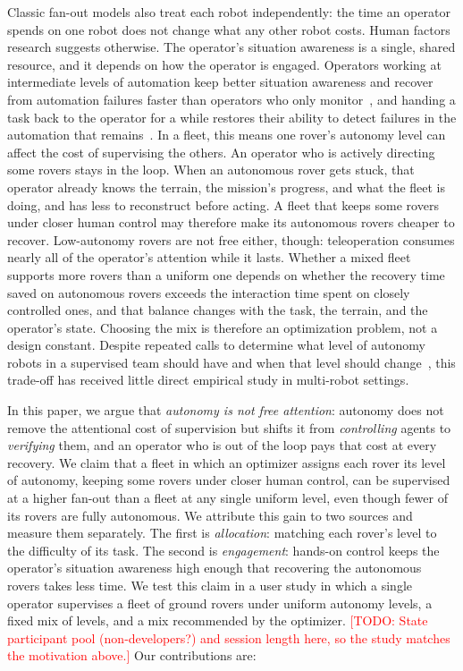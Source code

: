 \documentclass[conference]{IEEEtran}
\newcommand{\todo}[1]{\textcolor{red}{[TODO: #1]}}
\begin{document}
Classic fan-out models also treat each robot independently: the time
an operator spends on one robot does not change what any other robot
costs. Human factors research suggests otherwise. The operator's
situation awareness is a single, shared resource, and it depends on
how the operator is engaged. Operators working at intermediate levels
of automation keep better situation awareness and recover from
automation failures faster than operators who only
monitor~\cite{endsley1995outoftheloop,kaber2004effects}, and handing
a task back to the operator for a while restores their ability to
detect failures in the automation that remains~\cite{parasuraman1996effects}.
In a fleet, this means one rover's autonomy level can affect the
cost of supervising the others. An operator who is actively directing
some rovers stays in the loop. When an autonomous rover gets stuck,
that operator already knows the terrain, the mission's progress, and
what the fleet is doing, and has less to reconstruct before acting.
A fleet that keeps some rovers under closer human control may
therefore make its autonomous rovers cheaper to recover. Low-autonomy
rovers are not free either, though: teleoperation consumes nearly all
of the operator's attention while it lasts. Whether a mixed fleet
supports more rovers than a uniform one depends on whether the
recovery time saved on autonomous rovers exceeds the interaction time
spent on closely controlled ones, and that balance changes with the
task, the terrain, and the operator's state. Choosing the mix is
therefore an optimization problem, not a design constant. Despite
repeated calls to determine what level of autonomy robots in a
supervised team should have and when that level should
change~\cite{crandall2007identifying,chen2014human}, this trade-off
has received little direct empirical study in multi-robot settings.

In this paper, we argue that \emph{autonomy is not free attention}:
autonomy does not remove the attentional cost of supervision but
shifts it from \emph{controlling} agents to \emph{verifying} them,
and an operator who is out of the loop pays that cost at every
recovery. We claim that a fleet in which an optimizer assigns each
rover its level of autonomy, keeping some rovers under closer human
control, can be supervised at a higher fan-out than a fleet at any
single uniform level, even though fewer of its rovers are fully
autonomous. We attribute this gain to two sources and measure them
separately. The first is \emph{allocation}: matching each rover's
level to the difficulty of its task. The second is \emph{engagement}:
hands-on control keeps the operator's situation awareness high
enough that recovering the autonomous rovers takes less time. We
test this claim in a user study in which a single operator supervises
a fleet of ground rovers under uniform autonomy levels, a fixed mix
of levels, and a mix recommended by the optimizer.
\todo{State participant pool (non-developers?) and session length
here, so the study matches the motivation above.}
Our contributions are:
\end{document}
